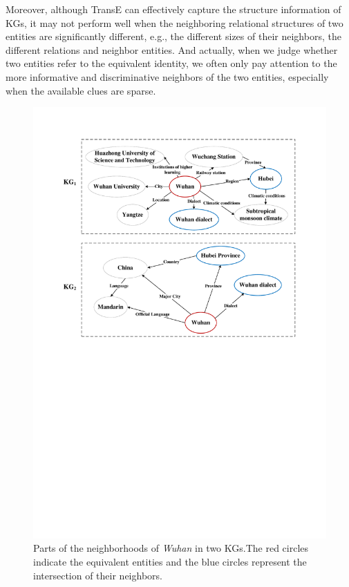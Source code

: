 	Moreover, although TransE can effectively capture the structure information of KGs, it may not perform well when the neighboring relational structures of two entities are significantly different, e.g., the different sizes of their neighbors, the different relations and neighbor entities. And actually, when we judge whether two entities refer to the equivalent identity, we often only pay attention to the more informative and discriminative neighbors of the two entities, especially when the available clues are sparse.
	\begin{figure}
		\begin{center}
			\includegraphics[width=1\linewidth]{graph1.pdf}
			\caption{Parts of the neighborhoods of \textit{Wuhan} in two KGs.The red circles indicate the equivalent entities and the blue circles represent the intersection of their neighbors.}
			\label{Wuhan}
		\end{center}
	\end{figure}
